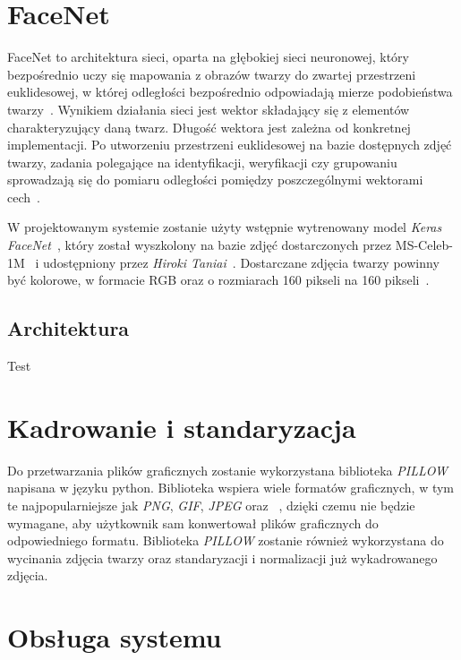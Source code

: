 \section{FaceNet}

FaceNet to architektura sieci, oparta na głębokiej sieci neuronowej, który bezpośrednio uczy się mapowania
z obrazów twarzy do zwartej przestrzeni euklidesowej,
w której odległości bezpośrednio odpowiadają mierze podobieństwa twarzy~\cite{schroff2015facenet}.
Wynikiem działania sieci jest wektor składający się z elementów charakteryzujący daną twarz.
Długość wektora jest zależna od konkretnej implementacji.
Po utworzeniu przestrzeni euklidesowej na bazie dostępnych zdjęć twarzy,
zadania polegające na identyfikacji, weryfikacji czy grupowaniu
sprowadzają się do pomiaru odległości pomiędzy poszczególnymi wektorami cech~\cite{schroff2015facenet}.

W projektowanym systemie zostanie użyty wstępnie wytrenowany model \textit{Keras FaceNet}~\cite{taniai-2018},
który został wyszkolony na bazie zdjęć dostarczonych przez MS-Celeb-1M~\cite{microsoft-2020-celeb1m}
i udostępniony przez \textit{Hiroki Taniai}~\cite{taniai-no-date}.
Dostarczane zdjęcia twarzy powinny być kolorowe, w formacie RGB oraz
o rozmiarach 160 pikseli na 160 pikseli~\cite{brownlee-2019}.

\subsection{Architektura}

Test


\section{Kadrowanie i standaryzacja}

Do przetwarzania plików graficznych zostanie wykorzystana biblioteka \textit{PILLOW} napisana w języku python.
Biblioteka wspiera wiele formatów graficznych,
w tym te najpopularniejsze jak \textit{PNG}, \textit{GIF}, \textit{JPEG} oraz ~\cite{pillow_doc},
dzięki czemu nie będzie wymagane, aby użytkownik sam konwertował plików graficznych do odpowiedniego formatu.
Biblioteka \textit{PILLOW} zostanie również wykorzystana do wycinania zdjęcia twarzy oraz standaryzacji
i normalizacji już wykadrowanego zdjęcia.


\section{Obsługa systemu}

